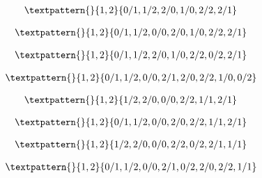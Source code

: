 \begin{equation}
	\begin{gathered}
		\textpattern{}{1,2}{0/1,1/2,2/0,1/0,2/2,2/1}
	\end{gathered}
	\label{cls:206}
\end{equation}

\begin{equation}
	\begin{gathered}
		\textpattern{}{1,2}{0/1,1/2,0/0,2/0,1/0,2/2,2/1}
	\end{gathered}
	\label{cls:207}
\end{equation}

\begin{equation}
	\begin{gathered}
		\textpattern{}{1,2}{0/1,1/2,2/0,1/0,2/2,0/2,2/1}
	\end{gathered}
	\label{cls:208}
\end{equation}

\begin{equation}
	\begin{gathered}
		\textpattern{}{1,2}{0/1,1/2,0/0,2/1,2/0,2/2,1/0,0/2}
	\end{gathered}
	\label{cls:209}
\end{equation}

\begin{equation}
	\begin{gathered}
		\textpattern{}{1,2}{1/2,2/0,0/0,2/2,1/1,2/1}
	\end{gathered}
	\label{cls:210}
\end{equation}

\begin{equation}
	\begin{gathered}
		\textpattern{}{1,2}{0/1,1/2,0/0,2/0,2/2,1/1,2/1}
	\end{gathered}
	\label{cls:211}
\end{equation}

\begin{equation}
	\begin{gathered}
		\textpattern{}{1,2}{1/2,2/0,0/0,2/2,0/2,2/1,1/1}
	\end{gathered}
	\label{cls:212}
\end{equation}

\begin{equation}
	\begin{gathered}
		\textpattern{}{1,2}{0/1,1/2,0/0,2/1,0/2,2/0,2/2,1/1}
	\end{gathered}
	\label{cls:213}
\end{equation}

